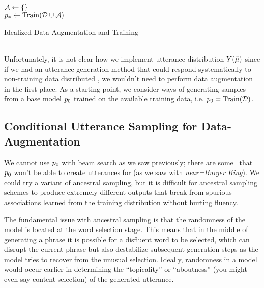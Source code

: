 \begin{algorithm}[t]
    ${\mathcal{A}} \gets \{\}$\\
    $p_* \gets \operatorname{Train}(\mathcal{D} \cup {\ensuremath{\mathcal{A}}})$\\
    \KwResult{$\gen_*$}
    \caption{Idealized Data-Augmentation and Training}
    \label{alg:idealda}
\end{algorithm}~\\

Unfortunately, it is not clear how we implement utterance distribution
$Y(\tilde{\mu})$ since if we had an utterance generation method that
could respond systematically to non-training data distributed
\meaningrepresentations, we wouldn't need to perform data augmentation in the
first place. As a starting point, we consider ways of generating samples from a
base model $p_0$  trained on the available training data, i.e.  $p_0 =
\operatorname{Train}(\mathcal{D})$.

\subsection{Conditional Utterance Sampling for Data-Augmentation}

We cannot use $p_0$ with beam search as we saw previously; there are some
\meaningrepresentations~that $p_0$ won't be able to create utterances for
(as we saw with \textit{near=Burger King}). We could try a variant of ancestral
sampling, but it is difficult for ancestral sampling schemes to produce
extremely different outputs that break from spurious associations learned from
the training distribution without hurting fluency. 

The fundamental issue with ancestral sampling is that the randomness of the
model is located at the word selection stage. This means that in the middle of
generating a phrase it is possible for a disfluent word to be selected, which
can disrupt the current phrase but also destabilize subsequent generation steps
as the model tries to recover from the unusual selection.  Ideally, randomness
in a model would occur earlier in determining the ``topicality'' or
``aboutness'' (you might even say content selection) of the generated
utterance. 

